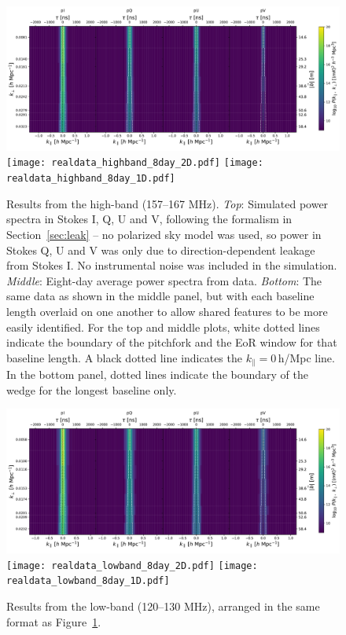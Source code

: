 \documentclass[twocolumn, trackchanges]{aastex61}
\begin{document}
\begin{figure}[h]
\centering
\includegraphics[scale=0.45]{simdata_highband_8day_2D.pdf}
\texttt{[image: realdata\_highband\_8day\_2D.pdf]}
\texttt{[image: realdata\_highband\_8day\_1D.pdf]}
\caption{Results from the high-band (157--167 MHz).  \textit{Top}: Simulated power spectra in Stokes I, Q, U and V, following the formalism in Section~\ref{sec:leak} -- no polarized sky model was used, so power in Stokes Q, U and V was only due to direction-dependent leakage from Stokes I.  No instrumental noise was included in the simulation. \textit{Middle}: Eight-day average power spectra from data. \textit{Bottom}: The same data as shown in the middle panel, but with each baseline length overlaid on one another to allow shared features to be more easily identified.  For the top and middle plots, white dotted lines indicate the boundary of the pitchfork and the EoR window for that baseline length. A black dotted line indicates the $k_{\parallel}=0$\,h/Mpc line.  In the bottom panel, dotted lines indicate the boundary of the wedge for the longest baseline only.
}
\label{fig:pitchforks_highband}
\end{figure}

\begin{figure}[h]
\centering
\includegraphics[scale=0.45]{simdata_lowband_8day_2D.pdf}
\texttt{[image: realdata\_lowband\_8day\_2D.pdf]}
\texttt{[image: realdata\_lowband\_8day\_1D.pdf]}
\caption{Results from the low-band (120--130 MHz), arranged in the same format as Figure~\ref{fig:pitchforks_highband}.}
\label{fig:pitchforks_lowband}
\end{figure}
\end{document}
